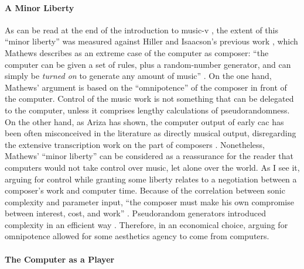 \paragraph{A Minor Liberty}
As can be read at the end of the introduction to \gls{music-v} \parencite{Mat63:The}, the extent of this ``minor liberty'' was measured against Hiller and Isaacson's previous work \parencite{Hil59:Exp}, which Mathews describes as an extreme case of the computer as composer: ``the computer can be given a set of rules, plus a random-number generator, and can simply be \textit{turned on} to generate any amount of music'' \parencite[557]{Mat63:The}. On the one hand, Mathews' argument is based on the ``omnipotence'' of the composer in front of the computer. Control of the music work is not something that can be delegated to the computer, unless it comprises lengthy calculations of pseudorandomness. On the other hand, as Ariza has shown, the computer output of early \gls{cac} has been often misconceived in the literature as directly musical output, disregarding the extensive transcription work on the part of composers \parencite{Ari05:Ano}. Nonetheless, Mathews' ``minor liberty'' can be considered as a reassurance for the reader that computers would not take control over music, let alone over the world. As I see it, arguing for control while granting some liberty relates to a negotiation between a composer's work and computer time. Because of the correlation between sonic complexity and parameter input, ``the composer must make his own compromise between interest, cost, and work'' \parencite[555]{Mat63:The}. Pseudorandom generators introduced complexity in an efficient way \parencite{fdch/papers/spectral}. Therefore, in an economical choice, arguing for omnipotence allowed for some aesthetics agency to come from computers. 

\paragraph{The Computer as a Player}

